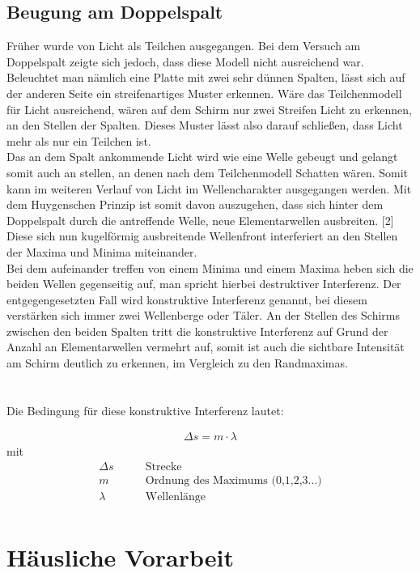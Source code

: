 \documentclass[a4paper]{scrartcl}
\numberwithin{equation}{subsection}
\begin{document}
\subsection{Beugung am Doppelspalt}
Früher wurde von Licht als Teilchen ausgegangen. Bei dem Versuch am Doppelspalt zeigte sich jedoch, dass diese Modell nicht ausreichend war. Beleuchtet man nämlich eine Platte mit zwei sehr dünnen Spalten, lässt sich auf der anderen Seite ein streifenartiges Muster erkennen. Wäre das Teilchenmodell für Licht ausreichend, wären auf dem Schirm nur zwei Streifen Licht zu erkennen, an den Stellen der Spalten. Dieses Muster lässt also darauf schließen, dass Licht mehr als nur ein Teilchen ist.\\
Das an dem Spalt ankommende Licht wird wie eine Welle gebeugt und gelangt somit auch an stellen, an denen nach dem Teilchenmodell Schatten wären. Somit kann im weiteren Verlauf von Licht im Wellencharakter ausgegangen werden. Mit dem Huygenschen Prinzip ist somit davon auszugehen, dass sich hinter dem Doppelspalt durch die antreffende Welle, neue Elementarwellen ausbreiten. [2]
Diese sich nun kugelförmig ausbreitende Wellenfront interferiert an den Stellen der Maxima und Minima miteinander.\\
Bei dem aufeinander treffen von einem Minima und einem Maxima heben sich die beiden Wellen gegenseitig auf, man spricht hierbei destruktiver Interferenz. Der entgegengesetzten Fall wird konstruktive Interferenz genannt, bei diesem verstärken sich immer zwei Wellenberge oder Täler.
An der Stellen des Schirms zwischen den beiden Spalten tritt die konstruktive Interferenz auf Grund der Anzahl an Elementarwellen vermehrt auf, somit ist auch die sichtbare Intensität am Schirm deutlich zu erkennen, im Vergleich zu den Randmaximas.\\
 \\
 \\
Die Bedingung für diese konstruktive Interferenz lautet:

\begin{align}
\Delta s = m \cdot \lambda
\end{align}
mit
\begin{align*}
\Delta s \qquad &\text{Strecke}\\
m \qquad &\text{Ordnung des Maximums (0,1,2,3...)}\\
\lambda \qquad &\text{Wellenlänge}\\
\end{align*}
\newpage

\section{Häusliche Vorarbeit}
\end{document}
